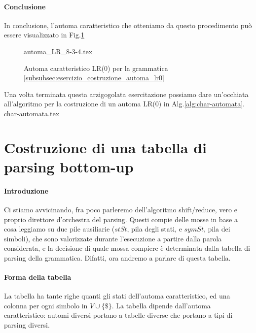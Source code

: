 \documentclass[class=book, crop=false, oneside, 12pt]{standalone}
\begin{document}
\paragraph{Conclusione}
In conclusione, l'automa caratteristico che otteniamo da questo procedimento può essere visualizzato in Fig.\ref{fig:charateristic-automata_cosntruction}
\begin{figure}[H]
    \centering
	{automa_LR_8-3-4.tex}
    \caption{Automa caratteristico LR(0) per la grammatica \ref{subsubsec:esercizio_costruzione_automa_lr0}}
    \label{fig:charateristic-automata_cosntruction}    
\end{figure}

Una volta terminata questa arzigogolata esercitazione possiamo dare un'occhiata all'algoritmo per la costruzione di un automa LR(0) in Alg.\ref{alg:char-automata}. \\
{char-automata.tex}


\section{Costruzione di una tabella di parsing bottom-up}
\paragraph{Introduzione}
Ci stiamo avvicinando, fra poco parleremo dell'algoritmo shift/reduce, vero e proprio direttore d'orchestra del parsing. Questi compie delle mosse in base a cosa leggiamo su due pile ausiliarie (\(stSt\), pila degli stati, e \(symSt\), pila dei simboli), che sono valorizzate durante l'esecuzione a partire dalla parola considerata, e la decisione di quale mossa compiere è determinata dalla tabella di parsing della grammatica. Difatti, ora andremo a parlare di questa tabella.

\paragraph{Forma della tabella}
La tabella ha tante righe quanti gli stati dell'automa caratteristico, ed una colonna per ogni simbolo in \(V \cup \{ \$ \}\). La tabella dipende dall'automa caratteristico: automi diversi portano a tabelle diverse che portano a tipi di parsing diversi. 
\end{document}
